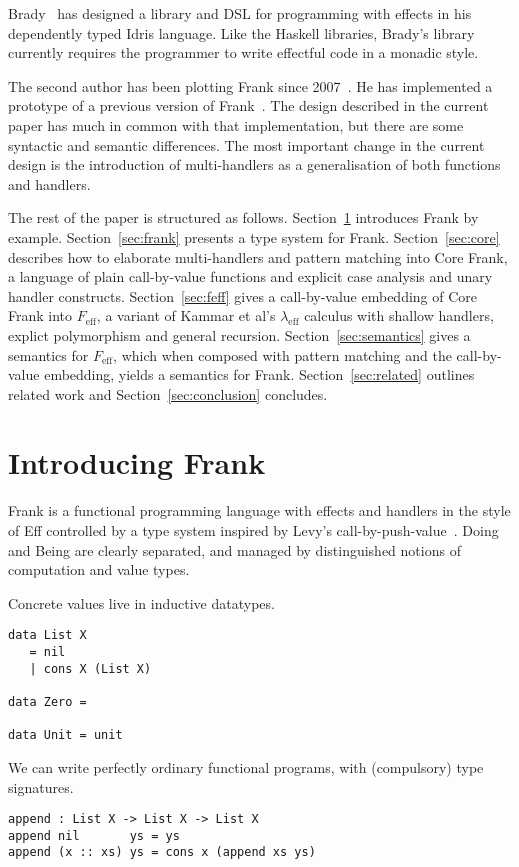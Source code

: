 \documentclass[preprint]{sigplanconf}
\newcommand{\lameff}{$\lambda_\mathrm{eff}$\xspace}
\newcommand{\feff}{$F_\textrm{eff}$\xspace}
\begin{document}
Brady~\cite{Brady13} has designed a library and DSL for programming
with effects in his dependently typed Idris language. Like the Haskell
libraries, Brady's library currently requires the programmer to write
effectful code in a monadic style.

The second author has been plotting Frank since
2007~\cite{McBride07}. He has implemented a prototype of a previous
version of Frank~\cite{McBride12}. The design described in the current
paper has much in common with that implementation, but there are some
syntactic and semantic differences. The most important change in the
current design is the introduction of multi-handlers as a
generalisation of both functions and handlers.

The rest of the paper is structured as follows.
%
Section~\ref{sec:examples} introduces Frank by
example. Section~\ref{sec:frank} presents a type system for
Frank. Section~\ref{sec:core} describes how to elaborate
multi-handlers and pattern matching into Core Frank, a language of
plain call-by-value functions and explicit case analysis and unary
handler constructs. Section~\ref{sec:feff} gives a call-by-value
embedding of Core Frank into \feff, a variant of Kammar et al's
\lameff calculus with shallow handlers, explict polymorphism and
general recursion. Section~\ref{sec:semantics} gives a semantics for
\feff, which when composed with pattern matching and the call-by-value
embedding, yields a semantics for Frank. Section~\ref{sec:related}
outlines related work and Section~\ref{sec:conclusion} concludes.

\section{Introducing Frank}
\label{sec:examples}

Frank is a functional programming language with effects and handlers
in the style of Eff controlled by a type system inspired by Levy's
call-by-push-value~\cite{Levy2004}.
%
Doing and Being are clearly separated, and managed by distinguished
notions of computation and value types.

Concrete values live in inductive datatypes.
%
\begin{verbatim}
data List X
   = nil
   | cons X (List X)

data Zero =

data Unit = unit
\end{verbatim}

We can write perfectly ordinary functional programs, with (compulsory)
type signatures.
%
\begin{verbatim}
append : List X -> List X -> List X
append nil       ys = ys
append (x :: xs) ys = cons x (append xs ys)
\end{verbatim}
\end{document}
